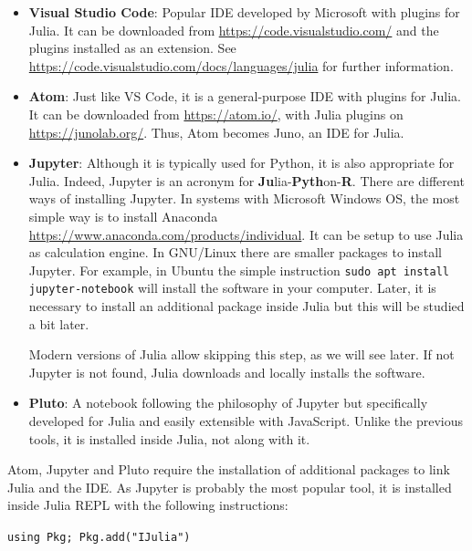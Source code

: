 \begin{itemize}
	\item \textbf{Visual Studio Code}: Popular IDE developed by Microsoft with plugins for Julia. It can be downloaded from \href{https://code.visualstudio.com/}{https://code.visualstudio.com/} and the plugins installed as an extension. See \href{https://code.visualstudio.com/docs/languages/julia}{https://code.visualstudio.com/docs/languages/julia} for further information.
	\item \textbf{Atom}: Just like VS Code, it is a general-purpose IDE with plugins for Julia. It can be downloaded from \href{https://atom.io/}{https://atom.io/}, with Julia plugins on \href{https://junolab.org/}{https://junolab.org/}. Thus, Atom becomes Juno, an IDE for Julia.
	\item \textbf{Jupyter}: Although it is typically used for Python, it is also appropriate for Julia. Indeed, Jupyter is an acronym for \textbf{Ju}lia-\textbf{Pyth}on-\textbf{R}. There are different ways of installing Jupyter. In systems with Microsoft Windows OS, the most simple way is to install Anaconda \href{https://www.anaconda.com/products/individual}{https://www.anaconda.com/products/individual}. It can be setup to use Julia as calculation engine. In GNU/Linux there are smaller packages to install Jupyter. For example, in Ubuntu the simple instruction \texttt{sudo apt install jupyter-notebook} will install the software in your computer. Later, it is necessary to install an additional package inside Julia but this will be studied a bit later.
	
	Modern versions of Julia allow skipping this step, as we will see later. If not Jupyter is not found, Julia  downloads and locally installs the software.
	\item \textbf{Pluto}: A notebook following the philosophy of Jupyter but specifically developed for Julia and easily extensible with JavaScript. Unlike the previous tools, it is installed inside Julia, not along with it. 
\end{itemize}
%
Atom, Jupyter and Pluto require the installation of additional packages to link Julia and the IDE. As Jupyter is probably the most popular tool, it is installed inside Julia REPL with the following instructions:

\vspace{1mm}
\begin{center}
	\texttt{using Pkg; Pkg.add("IJulia")}
\end{center}
\vspace{1mm}


